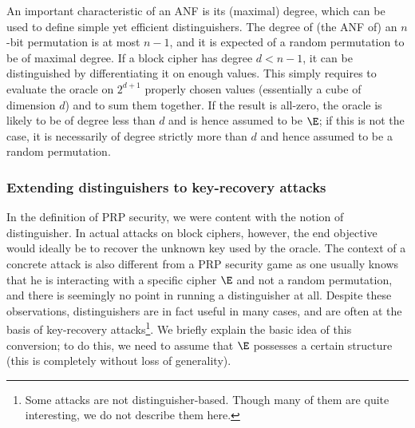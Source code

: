 An important characteristic of an ANF is its (maximal) degree, which can be used to define simple yet efficient distinguishers. The degree
of (the ANF of) an $n$-bit permutation is at most $n - 1$, and it is expected of a random permutation to be of maximal degree. If a block cipher
has degree $d < n - 1$, it can be distinguished by differentiating it on enough values. This simply requires to evaluate the oracle on $2^{d+1}$ properly chosen
values (essentially a cube of dimension $d$) and to sum them together. If the result is all-zero, the oracle is likely to be of degree less than
$d$ and is hence assumed to be $\E$; if this is not the case, it is necessarily of degree strictly more than $d$ and hence assumed to be a random permutation.

\subsubsection{Extending distinguishers to key-recovery attacks}

In the definition of PRP security, we were content with the notion of distinguisher. In actual attacks on block ciphers, however, the end objective
would ideally be to recover the unknown key used by the oracle. The context of a concrete attack is also different from a PRP security game as one usually knows that he is interacting with a specific
cipher $\E$ and not a random permutation, and there is seemingly no point in running a distinguisher at all.
Despite these observations, distinguishers are in fact useful in many cases, and are often at the basis of key-recovery attacks\footnote{Some attacks
are not distinguisher-based. Though many of them are quite interesting, we do not describe them here.}. We briefly explain
the basic idea of this conversion; to do this, we need to assume that $\E$ possesses a certain structure (this is completely without loss of generality).

